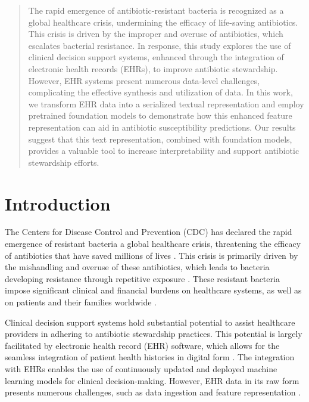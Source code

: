 \documentclass{article}
\theoremstyle{plain}
\theoremstyle{definition}
\theoremstyle{remark}
\begin{document}
\begin{abstract}
The rapid emergence of antibiotic-resistant bacteria is recognized as a global healthcare crisis, undermining the efficacy of life-saving antibiotics. This crisis is driven by the improper and overuse of antibiotics, which escalates bacterial resistance. In response, this study explores the use of clinical decision support systems, enhanced through the integration of electronic health records (EHRs), to improve antibiotic stewardship. However, EHR systems present numerous data-level challenges, complicating the effective synthesis and utilization of data. In this work, we transform EHR data into a serialized textual representation and employ pretrained foundation models to demonstrate how this enhanced feature representation can aid in antibiotic susceptibility predictions. Our results suggest that this text representation, combined with foundation models, provides a valuable tool to increase interpretability and support antibiotic stewardship efforts.
\end{abstract}

\section{Introduction}

The Centers for Disease Control and Prevention (CDC) has declared the rapid emergence of resistant bacteria a global healthcare crisis, threatening the efficacy of antibiotics that have saved millions of lives \citep{ventola2015antibiotic, golkar2014bacteriophage, gould2013new, sengupta2013multifaceted, nature2013antibiotic, lushniak2014antibiotic}. This crisis is primarily driven by the mishandling and overuse of these antibiotics, which leads to bacteria developing resistance through repetitive exposure \cite{viswanathan2014off, read2014antibiotic}. 
These resistant bacteria impose significant clinical and financial burdens on healthcare systems, as well as on patients and their families worldwide \cite{bartlett2013seven}.

Clinical decision support systems hold substantial potential to assist healthcare providers in adhering to antibiotic stewardship practices. This potential is largely facilitated by electronic health record (EHR) software, which allows for the seamless integration of patient health histories in digital form \cite{evans2016electronic, cowie2017electronic, hoerbst2010electronic}. The integration with EHRs enables the use of continuously updated and deployed machine learning models for clinical decision-making. However, EHR data in its raw form presents numerous challenges, such as data ingestion and feature representation \cite{wu2010prediction}.
\end{document}
